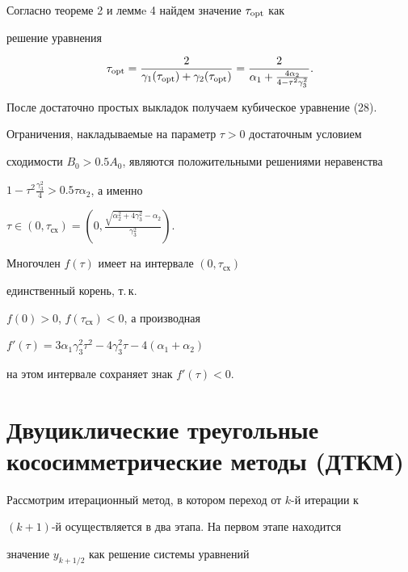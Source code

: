 \begin{pf} 


Согласно теореме 2 и леммe 4 найдем значение $\tau_{\operatorname{opt}}$ как 


решение уравнения 


$$ 


\tau_{\opt}=\frac{2}{\gamma_1(\tau_{\opt})+ 


\gamma_2(\tau_{\opt})}=\frac{2}{\alpha_1+ 


\frac{4\alpha_2}{4-\tau^2\gamma^2_3}}. 


$$ 


После достаточно простых выкладок получаем кубическое уравнение (28). 


Ограничения, накладываемые на параметр $\tau>0$ достаточным условием 


сходимости $B_0>0.5A_0$, являются положительными решениями неравенства 


$1-\tau^2\frac{\gamma^2_3}{4}>0.5\tau\alpha_2$, а именно \tts{!!} 


$\tau\in(0,\tau_{\text{сх}})=\left(0, 


\frac{\sqrt{\alpha^2_2+4\gamma^2_3}-\alpha_2}{\gamma^2_3}\right)$. 


Многочлен $f(\tau)$ имеет на интервале $(0,\tau_{\text{сх}})$ \tts{!!} 


единственный корень, т.\,к. 


$f(0)>0$, $f(\tau_{\text{сх}})<0$, \tts{!!} а производная 


$f'(\tau)=3\alpha_1\gamma^2_3\tau^2-4\gamma^2_3\tau-


4(\alpha_1+\alpha_2)$ 


на этом интервале сохраняет знак $f'(\tau)<0$. 


\end{pf} 


 


\section{Двуциклические треугольные кососимметрические методы (ДТКМ)} 


 


Рассмотрим итерационный метод, в котором переход от $k$-й итерации к 


$(k{+}1)$-й осуществляется в два этапа. На первом этапе находится 


значение $y_{k+1/2}$ как решение системы уравнений 


